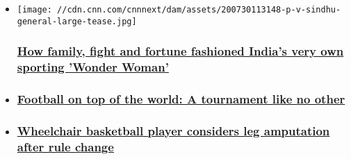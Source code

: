 \begin{itemize}
\item
  \href{/2020/08/02/sport/p-v-sindhu-olympics-india-badminton-cmd-spt-intl/index.html}{}

  \texttt{[image: //cdn.cnn.com/cnnnext/dam/assets/200730113148-p-v-sindhu-general-large-tease.jpg]}

  \hypertarget{how-family-fight-and-fortune-fashioned-indias-very-own-sporting-wonder-woman}{%
  \subsubsection{\texorpdfstring{\href{/2020/08/02/sport/p-v-sindhu-olympics-india-badminton-cmd-spt-intl/index.html}{How
  family, fight and fortune fashioned India's very own sporting 'Wonder
  Woman'}}{How family, fight and fortune fashioned India's very own sporting 'Wonder Woman'}}\label{how-family-fight-and-fortune-fashioned-indias-very-own-sporting-wonder-woman}}
\item
  \hypertarget{football-on-top-of-the-world-a-tournament-like-no-other}{%
  \subsubsection{\texorpdfstring{\href{/2020/06/09/football/gallery/nepal-football-on-top-of-the-world-spt-intl-cmd/index.html}{Football
  on top of the world: A tournament like no
  other}}{Football on top of the world: A tournament like no other}}\label{football-on-top-of-the-world-a-tournament-like-no-other}}
\item
  \hypertarget{wheelchair-basketball-player-considers-leg-amputation-after-rule-change}{%
  \subsubsection{\texorpdfstring{\href{/2020/07/30/sport/wheelchair-paralympics-amputation-compete-scli-spt-intl-gbr/index.html}{Wheelchair
  basketball player considers leg amputation after rule
  change}}{Wheelchair basketball player considers leg amputation after rule change}}\label{wheelchair-basketball-player-considers-leg-amputation-after-rule-change}}
\end{itemize}

